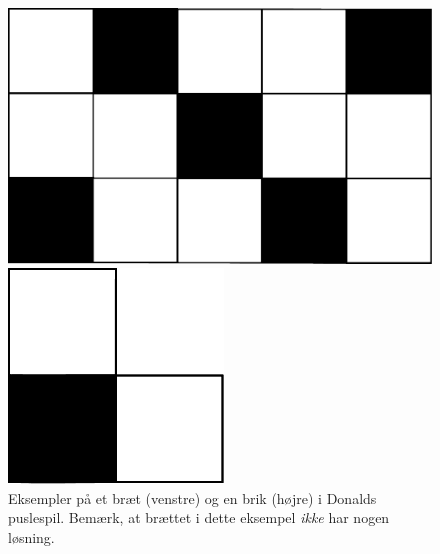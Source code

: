 \begin{figure}[htbp]
    \centering
    \vspace*{15pt}
    \begin{minipage}[h]{0.55\linewidth}
        \centering
        \includegraphics[width=\textwidth]{figures/braet.pdf}
    \end{minipage}
    \hspace*{.1\linewidth}
    \begin{minipage}[h]{0.2\linewidth}
        \centering
        \includegraphics[width=\textwidth]{figures/brik.pdf}
    \end{minipage}
    \vspace*{15pt}
    \caption{Eksempler på et bræt (venstre) og en brik (højre) i Donalds
        puslespil. Bemærk, at brættet i dette eksempel \emph{ikke} har nogen
        løsning.}
\end{figure}

